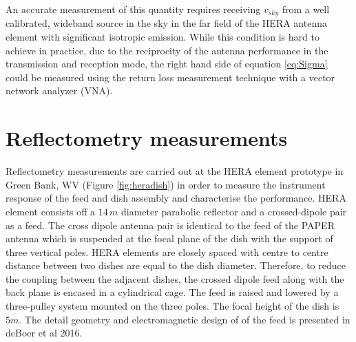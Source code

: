 \documentclass[twocolumn]{emulateapj}
\newcommand{\volt}{{v}}
\newcommand{\dfngexp}{{e^{2\pi i\nu \Delta \tau}}}
\begin{document}

An accurate measurement of this quantity requires receiving $v_{sky}$ from a well calibrated, wideband source in the sky in the far field of the HERA antenna element with significant isotropic emission. While this condition is hard to achieve in practice, due to the reciprocity of the antenna performance in the transmission and reception mode, the right hand side of equation \ref{eq:Sigma} could be measured using the return loss measurement technique with a vector network analyzer (VNA). \\
\section{\textbf{Reflectometry measurements}} 

Reflectometry measurements are carried out at the HERA element prototype in Green
Bank, WV (Figure \ref{fig:heradish}) in order to measure the instrument response of the feed and dish assembly and characterise the performance.  HERA element consists off a $14\,m$ diameter
parabolic reflector and a crossed-dipole pair as a feed. The cross dipole antenna pair is identical to the feed of the PAPER antenna which is suspended at the focal plane of the dish with the support of three vertical poles. HERA elements are closely spaced with centre to centre distance between two dishes are equal to the dish diameter. Therefore, to reduce the coupling between the adjacent dishes, the crossed dipole feed along with the back plane is encased in a cylindrical cage. The feed is raised and
lowered by a three-pulley system mounted on the three poles. The focal height of the dish is $5m$.  The detail geometry and electromagnetic design of of the feed is presented in deBoer et al 2016. \\
\end{document}
